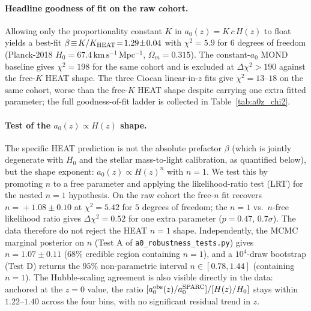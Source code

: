 \documentclass[twocolumn,letterpaper]{aastex631}
\newcommand{\azero}{a_0}
\begin{document}
\paragraph{Headline goodness of fit on the raw cohort.}  Allowing
only the proportionality constant $K$ in
$\azero(z)\!=\!K\,c\,H(z)$ to float yields a best-fit
$\beta\!\equiv\!K/K_{\rm HEAT}\!=\!1.29\!\pm\!0.04$ with
$\chi^{2}\!=\!5.9$ for $6$ degrees of freedom (Planck-2018
$H_{0}\!=\!67.4\,\mathrm{km\,s^{-1}\,Mpc^{-1}}$, $\Omega_{m}\!=\!0.315$).
The constant-$\azero$ MOND baseline gives $\chi^{2}\!=\!198$ for
the same cohort and is excluded at $\Delta\chi^{2}\!>\!190$
against the free-$K$ HEAT shape.  The three Ciocan linear-in-$z$
fits give $\chi^{2}\!=\!13$--$18$ on the same cohort, worse than
the free-$K$ HEAT shape despite carrying one extra fitted
parameter; the full goodness-of-fit ladder is collected in
Table~\ref{tab:a0z_chi2}.

\paragraph{Test of the $\azero(z)\!\propto\!H(z)$ shape.}  The
specific HEAT prediction is not the absolute prefactor $\beta$
(which is jointly degenerate with $H_{0}$ and the stellar
mass-to-light calibration, as quantified below), but the shape
exponent: $\azero(z)\!\propto\!H(z)^{n}$ with $n\!=\!1$.  We test
this by promoting $n$ to a free parameter and applying the
likelihood-ratio test (LRT) for the nested $n\!=\!1$ hypothesis.
On the raw cohort the free-$n$ fit recovers
$n\!=\!+1.08\!\pm\!0.10$ at $\chi^{2}\!=\!5.42$ for $5$ degrees
of freedom; the $n\!=\!1$ vs.\ $n$-free likelihood ratio gives
$\Delta\chi^{2}\!=\!0.52$ for one extra parameter
($p\!=\!0.47$, $0.7\sigma$).  The data therefore do not reject
the HEAT $n\!=\!1$ shape.  Independently, the MCMC marginal
posterior on $n$ (Test A of
\texttt{a0\_robustness\_tests.py}) gives
$n\!=\!1.07\!\pm\!0.11$ ($68\%$ credible region containing
$n\!=\!1$), and a $10^{4}$-draw bootstrap (Test D) returns the
$95\%$ non-parametric interval $n\!\in\![0.78, 1.44]$
(containing $n\!=\!1$).  The Hubble-scaling agreement is also
visible directly in the data: anchored at the
\citet{Desmond2023} $z\!=\!0$ value, the ratio
$[\azero^{\rm obs}(z)/\azero^{\rm SPARC}]/[H(z)/H_{0}]$ stays
within $1.22$--$1.40$ across the four \citet{Ciocan2026RAR}
bins, with no significant residual trend in $z$.
\end{document}
